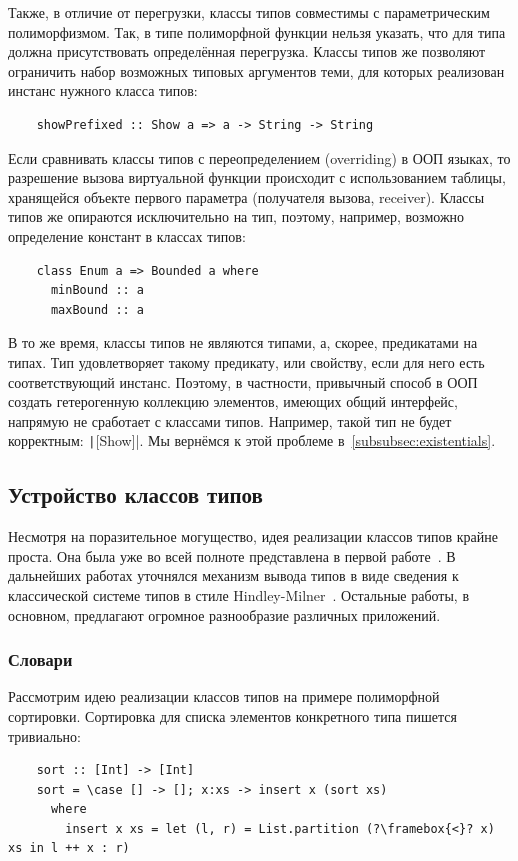 Также, в отличие от перегрузки, классы типов совместимы с параметрическим полиморфизмом.
Так, в типе полиморфной функции нельзя указать, что для типа должна присутствовать определённая перегрузка.
Классы типов же позволяют ограничить набор возможных типовых аргументов теми, для которых реализован инстанс нужного класса типов:
\begin{verbatim}
    showPrefixed :: Show a => a -> String -> String
\end{verbatim}

Если сравнивать классы типов с переопределением (overriding) в ООП языках, то разрешение вызова виртуальной функции происходит с использованием таблицы, хранящейся объекте первого параметра (получателя вызова, receiver).
Классы типов же опираются исключительно на тип, поэтому, например, возможно определение констант в классах типов:
\begin{verbatim}
    class Enum a => Bounded a where
      minBound :: a
      maxBound :: a
\end{verbatim}

В то же время, классы типов не являются типами, а, скорее, предикатами на типах.
Тип удовлетворяет такому предикату, или свойству, если для него есть соответствующий инстанс.
Поэтому, в частности, привычный способ в ООП создать гетерогенную коллекцию элементов, имеющих общий интерфейс, напрямую не сработает с классами типов.
Например, такой тип не будет корректным: \texttt|[Show]|.
Мы вернёмся к этой проблеме в~\ref{subsubsec:existentials}.

\subsection{Устройство классов типов}

Несмотря на поразительное могущество, идея реализации классов типов крайне проста.
Она была уже во всей полноте представлена в первой работе~\cite{wadler1989make}.
В дальнейших работах уточнялся механизм вывода типов в виде сведения к классической системе типов в стиле Hindley-Milner~\cite{hall1996type}.
Остальные работы, в основном, предлагают огромное разнообразие различных приложений.

\subsubsection{Словари} \label{subsubsec:tc-dict}

Рассмотрим идею реализации классов типов на примере полиморфной сортировки.
Сортировка для списка элементов конкретного типа пишется тривиально:
\begin{verbatim}
    sort :: [Int] -> [Int]
    sort = \case [] -> []; x:xs -> insert x (sort xs)
      where
        insert x xs = let (l, r) = List.partition (?\framebox{<}? x) xs in l ++ x : r)
\end{verbatim}

